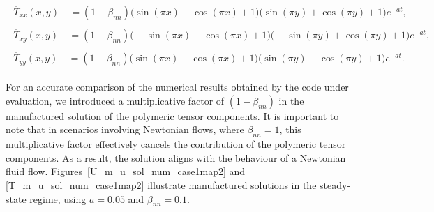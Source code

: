 \documentclass[preprint, 12pt]{elsarticle}
\begin{document}
\small
\begin{gather}
    \begin{aligned}
        \overline{T}_{xx}(x,y) &~= (1-\beta_{nn})\bigg(\sin(\pi x)+\cos(\pi x)+1\bigg)\bigg(\sin(\pi  y)+\cos (\pi y)+1\bigg)e^{-a t},\label{eq:txx_case0_2}
    \end{aligned}
\end{gather}
\begin{gather}
    \begin{aligned}
        \overline{T}_{xy}(x,y) &~= (1-\beta_{nn})\bigg(-\sin(\pi x)+\cos (\pi x)+1\bigg)\bigg(-\sin (\pi  y)+\cos (\pi  y)+1\bigg)e^{-a t},\label{eq:txy_case0_2}
    \end{aligned}
\end{gather}
\begin{gather}
    \begin{aligned}
        \overline{T}_{yy}(x,y) &~= (1-\beta_{nn})\bigg(\sin(\pi x)-\cos(\pi  x)+1\bigg)\bigg(\sin(\pi y)-\cos(\pi y)+1\bigg)e^{-a t}.\label{eq:tyy_case0_2}
    \end{aligned}
\end{gather}

\normalsize

For an accurate comparison of the numerical results obtained by the code under
evaluation, we introduced a multiplicative factor of $(1-\beta_{nn})$ in the
manufactured solution of the polymeric tensor components. It is important to
note that in scenarios involving Newtonian flows, where $\beta_{nn} = 1$, this
multiplicative factor effectively cancels the contribution of the polymeric
tensor components. As a result, the solution aligns with the behaviour of a
Newtonian fluid flow. Figures~\ref{U_m_u_sol_num_case1map2} and
\ref{T_m_u_sol_num_case1map2} illustrate manufactured solutions in the
steady-state regime, using $a = 0.05$ and $\beta_{nn}=0.1$.
\end{document}
